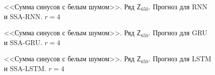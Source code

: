 \documentclass[specialist,
               substylefile = spbu.rtx,
               subf,href,colorlinks=true, 12p]{disser}
\begin{document}
\begin{figure}[H]
	\captionsetup{justification=centering}
	\caption{<<Сумма синусов с белым шумом>>. Ряд $\mathsf{Z}_{650}$. Прогноз для RNN и SSA-RNN. $r = 4$}
	\label{edsinr_r4_res_rnn}
\end{figure}

\begin{figure}[H]
	\captionsetup{justification=centering}
	\caption{<<Сумма синусов с белым шумом>>. Ряд $\mathsf{Z}_{650}$. Прогноз для GRU и SSA-GRU. $r = 4$}
	\label{edsinr_r4_res_gru}
\end{figure}

\begin{figure}[H]
	\captionsetup{justification=centering}
	\caption{<<Сумма синусов с белым шумом>>. Ряд $\mathsf{Z}_{650}$. Прогноз для LSTM и SSA-LSTM. $r = 4$}
	\label{edsinr_r4_res_lstm}
\end{figure}
\end{document}

